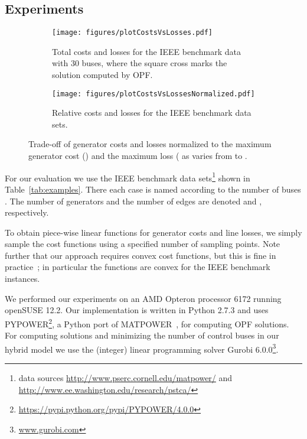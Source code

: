 \documentclass{article}[11pt,a4paper]
\newcommand{\plotscale}{0.8}
\begin{document}
\subsection{Experiments}
\label{sub:experiments-control-units}
\begin{figure}[tb!]\centering
  \begin{subfigure}[t]{.492\textwidth}
  	\centering
    	\texttt{[image: figures/plotCostsVsLosses.pdf]}
	\caption{Total costs and losses for the IEEE benchmark data with 30 buses, where the square cross marks the solution computed by OPF.}
	\label{fig:plot-costs-losses}
\end{subfigure}
\hfill
  \begin{subfigure}[t]{.492\textwidth}
  	\centering
\texttt{[image: figures/plotCostsVsLossesNormalized.pdf]}
	\caption{Relative costs and losses for the IEEE benchmark data sets.}
	\label{fig:plot-costs-losses-normalized}
\end{subfigure}
\caption{Trade-off of generator costs and losses
          normalized to the maximum generator cost () and
          the maximum loss ( as  varies
          from  to .}
\end{figure}

For our evaluation we use the IEEE benchmark data sets\footnote{data
  sources \url{http://www.pserc.cornell.edu/matpower/} and
  \url{http://www.ee.washington.edu/research/pstca/}} shown in
Table~\ref{tab:examples}. There each case is named according to the
number of buses .  The number of generators and the number of
edges are denoted  and , respectively.

 To obtain piece-wise linear functions for generator costs and line
 losses, we simply sample the cost functions using a specified number
 of sampling points.  Note further that our approach requires convex
 cost functions, but this is fine in practice~\cite{wood1996power}; in
 particular the functions are convex for the IEEE benchmark instances.

We performed our experiments on an AMD Opteron processor 6172 running
 openSUSE 12.2. Our implementation is written in Python 2.7.3 and uses
 PYPOWER\footnote{\url{https://pypi.python.org/pypi/PYPOWER/4.0.0}}, a
 Python port of MATPOWER~\cite{Zimmerman2009,Zimmerman2011a}, for
 computing OPF solutions.  For computing solutions and minimizing the
 number of control buses in our hybrid model we use the (integer)
 linear programming solver Gurobi
 6.0.0\footnote{\url{www.gurobi.com}}.
\end{document}
